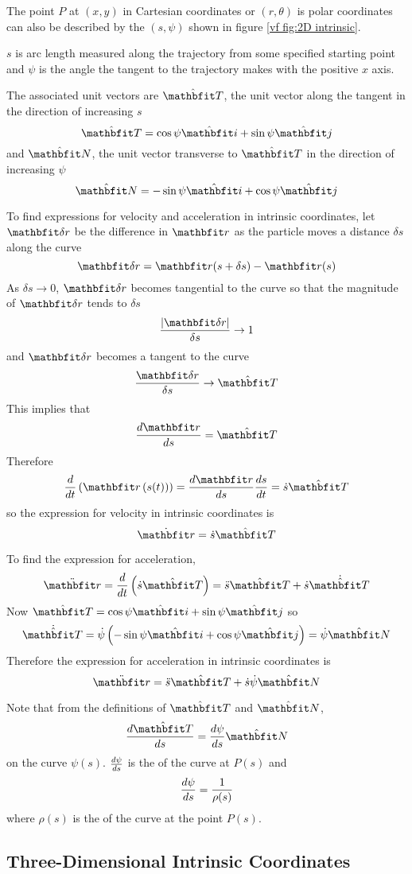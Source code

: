 The point $P$ at $(x,y)$ in Cartesian coordinates or $(r,\theta)$ is polar
coordinates can also be described by the  
$(s,\psi)$ shown in figure \ref{vf fig:2D intrinsic}.

$s$ is arc length measured along the trajectory from some specified starting
point and $\psi$ is the angle the tangent to the trajectory makes with the
positive $x$ axis.

The associated unit vectors are $\Tvect$, the unit vector along the tangent
in the direction of increasing $s$
$$\Tvect=\cos\psi\ivect+\sin\psi\jvect$$
and $\Nvect$, the unit vector transverse to $\Tvect$ in the direction of
increasing $\psi$
$$\Nvect=-\sin\psi\ivect+\cos\psi\jvect$$

To find expressions for velocity and acceleration in intrinsic coordinates,
let $\vect{\delta r}$ be the difference in $\vect{r}$ as the particle moves a
distance $\delta s$ along the curve 
$$\vect{\delta r}=\vect{r}(s+\delta s)-\vect{r}(s)$$
As $\delta s\to 0$, $\vect{\delta r}$ becomes tangential to the curve so
that the magnitude of $\vect{\delta r}$ tends to $\delta s$
$$\frac{\left|\vect{\delta r}\right|}{\delta s}\to 1$$
and $\vect{\delta r}$ becomes a tangent to the curve
$$\frac{\vect{\delta r}}{\delta s}\to \Tvect$$
This implies that
$$\der{\vect{r}}{s}=\Tvect$$
Therefore
$$\dbd{t}\left(\vect{r}\left(s(t)\right)\right)=\der{\vect{r}}{s}\der{s}{t}
=\dot{s}\Tvect$$
so the expression for velocity in intrinsic coordinates is
$$\dot{\vect{r}}=\dot{s}\Tvect$$

To find the expression for acceleration, 
$$\ddot{\vect{r}}=\dbd{t}\left(\dot{s}\Tvect\right)
=\ddot{s}\Tvect+\dot{s}\dot{\Tvect}$$
Now $\Tvect=\cos\psi\ivect+\sin\psi\jvect$ so
$$\dot{\Tvect}=\dot{\psi}\left(-\sin\psi\ivect+\cos\psi\jvect\right)
=\dot{\psi}\Nvect$$
Therefore the expression for acceleration in intrinsic coordinates is
$$\ddot{\vect{r}}=\ddot{s}\Tvect+\dot{s}\dot{\psi}\Nvect$$

Note that from the definitions of $\Tvect$ and $\Nvect$,
$$\der{\Tvect}{s}=\der{\psi}{s}\Nvect$$
on the curve $\psi(s)$. $\frac{d\psi}{ds}$ is the  of the curve
at $P(s)$ and
$$\frac{d\psi}{ds}=\frac{1}{\rho(s)}$$
where $\rho(s)$ is the  of the curve at the point
$P(s)$.

\subsection{Three-Dimensional Intrinsic Coordinates}


